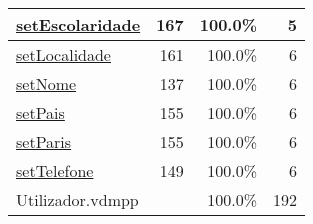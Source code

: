 \begin{longtable}{|l|r|r|r|}
\hline
\hyperref[setEscolaridade:167]{setEscolaridade} & 167&100.0\% & 5 \\
\hline
\hyperref[setLocalidade:161]{setLocalidade} & 161&100.0\% & 6 \\
\hline
\hyperref[setNome:137]{setNome} & 137&100.0\% & 6 \\
\hline
\hyperref[setPais:155]{setPais} & 155&100.0\% & 6 \\
\hline
\hyperref[setParis:155]{setParis} & 155&100.0\% & 6 \\
\hline
\hyperref[setTelefone:149]{setTelefone} & 149&100.0\% & 6 \\
\hline
\hline
Utilizador.vdmpp & & 100.0\% & 192 \\
\hline
\end{longtable}

